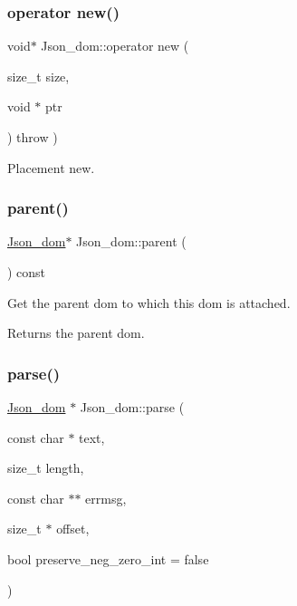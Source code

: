 \subsubsection{\texorpdfstring{operator new()}{operator new()}\hspace{0.1cm}{\footnotesize\ttfamily [2/2]}}
{\footnotesize\ttfamily void$\ast$ Json\+\_\+dom\+::operator new (\begin{DoxyParamCaption}\item[{size\+\_\+t}]{size,  }\item[{void $\ast$}]{ptr }\end{DoxyParamCaption}) throw  ) \hspace{0.3cm}{\ttfamily [inline]}}

Placement new. \mbox{\label{classJson__dom_a0cd11e9bcf413aaf092fbf87a85d8dc4}} 
\subsubsection{\texorpdfstring{parent()}{parent()}}
{\footnotesize\ttfamily \mbox{\hyperlink{classJson__dom}{Json\+\_\+dom}}$\ast$ Json\+\_\+dom\+::parent (\begin{DoxyParamCaption}{ }\end{DoxyParamCaption}) const\hspace{0.3cm}{\ttfamily [inline]}}

Get the parent dom to which this dom is attached.

\begin{DoxyReturn}{Returns}
the parent dom. 
\end{DoxyReturn}
\mbox{\label{classJson__dom_a9615aa0ae1427d5f5986a2d85d506716}} 
\subsubsection{\texorpdfstring{parse()}{parse()}\hspace{0.1cm}{\footnotesize\ttfamily [1/2]}}
{\footnotesize\ttfamily \mbox{\hyperlink{classJson__dom}{Json\+\_\+dom}} $\ast$ Json\+\_\+dom\+::parse (\begin{DoxyParamCaption}\item[{const char $\ast$}]{text,  }\item[{size\+\_\+t}]{length,  }\item[{const char $\ast$$\ast$}]{errmsg,  }\item[{size\+\_\+t $\ast$}]{offset,  }\item[{bool}]{preserve\+\_\+neg\+\_\+zero\+\_\+int = {\ttfamily false} }\end{DoxyParamCaption})\hspace{0.3cm}{\ttfamily [static]}}

